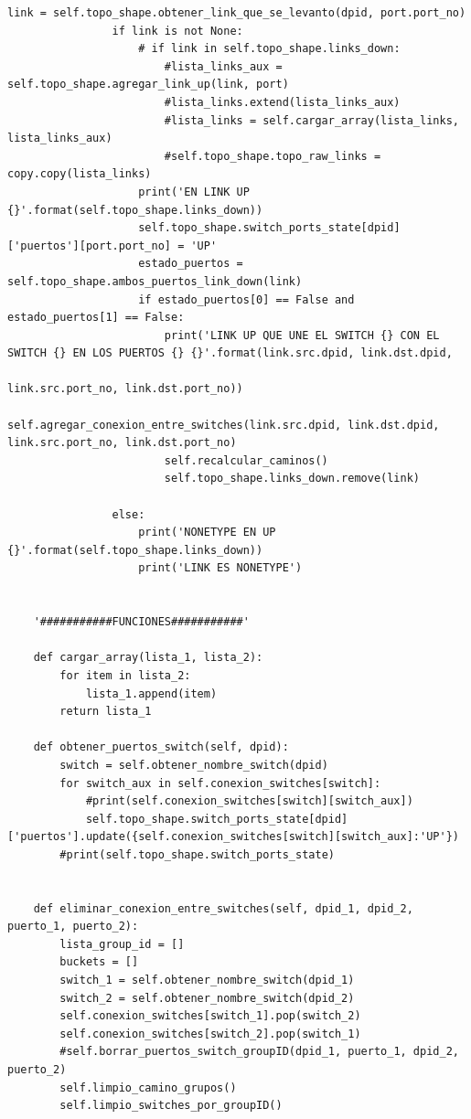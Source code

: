 \documentclass[12pt,a4paper,oneside]{book}
\begin{document}
\begin{lstlisting}[style=codigobase,  label = cod_correrP, caption= controlador.py]
                link = self.topo_shape.obtener_link_que_se_levanto(dpid, port.port_no)
                if link is not None:
                    # if link in self.topo_shape.links_down:
                        #lista_links_aux = self.topo_shape.agregar_link_up(link, port)
                        #lista_links.extend(lista_links_aux)
                        #lista_links = self.cargar_array(lista_links, lista_links_aux)
                        #self.topo_shape.topo_raw_links = copy.copy(lista_links)
                    print('EN LINK UP {}'.format(self.topo_shape.links_down))
                    self.topo_shape.switch_ports_state[dpid]['puertos'][port.port_no] = 'UP'
                    estado_puertos = self.topo_shape.ambos_puertos_link_down(link)
                    if estado_puertos[0] == False and estado_puertos[1] == False:
                        print('LINK UP QUE UNE EL SWITCH {} CON EL SWITCH {} EN LOS PUERTOS {} {}'.format(link.src.dpid, link.dst.dpid,
                                                                                                            link.src.port_no, link.dst.port_no))
                        self.agregar_conexion_entre_switches(link.src.dpid, link.dst.dpid, link.src.port_no, link.dst.port_no)
                        self.recalcular_caminos()
                        self.topo_shape.links_down.remove(link)

                else:
                    print('NONETYPE EN UP {}'.format(self.topo_shape.links_down))
                    print('LINK ES NONETYPE')


    '###########FUNCIONES###########'

    def cargar_array(lista_1, lista_2):
        for item in lista_2:
            lista_1.append(item)
        return lista_1

    def obtener_puertos_switch(self, dpid):
        switch = self.obtener_nombre_switch(dpid)
        for switch_aux in self.conexion_switches[switch]:
            #print(self.conexion_switches[switch][switch_aux])
            self.topo_shape.switch_ports_state[dpid]['puertos'].update({self.conexion_switches[switch][switch_aux]:'UP'})
        #print(self.topo_shape.switch_ports_state)


    def eliminar_conexion_entre_switches(self, dpid_1, dpid_2, puerto_1, puerto_2):
        lista_group_id = []
        buckets = []
        switch_1 = self.obtener_nombre_switch(dpid_1)
        switch_2 = self.obtener_nombre_switch(dpid_2)
        self.conexion_switches[switch_1].pop(switch_2)
        self.conexion_switches[switch_2].pop(switch_1)
        #self.borrar_puertos_switch_groupID(dpid_1, puerto_1, dpid_2, puerto_2)
        self.limpio_camino_grupos()
        self.limpio_switches_por_groupID()



\end{lstlisting}
\end{document}

